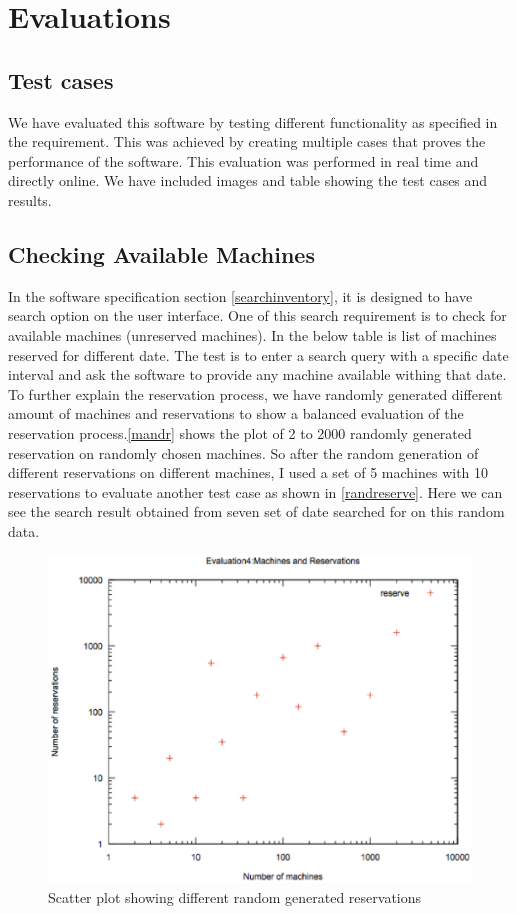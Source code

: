 \chapter{Evaluations} 
\label{chap:refs}
\label{chap:ch5_abbr}
\section{Test cases}
We have evaluated this software by testing different functionality as specified in the requirement. This was achieved by creating multiple cases that proves the performance of the software. This evaluation was performed in real time and directly online. We have included images and table showing the test cases and results. 
\section*{Checking Available Machines}
In the software specification section \ref{searchinventory}, it is designed to have search option on the user interface. One of this search requirement is to check for available machines (unreserved machines). In the below table is list of machines reserved for different date. The test is to enter a search query with a specific date interval and ask the software to provide any machine available withing that date.
To further explain the reservation process, we have randomly generated different amount of machines and reservations to show a balanced evaluation of the reservation process.\autoref{mandr} shows the plot of 2 to 2000 randomly generated reservation on randomly chosen machines. So after the random generation of different reservations on different machines, I used a set of 5 machines with 10 reservations to evaluate another test case as shown in \autoref{randreserve}. Here we can see the search result obtained from seven set of date searched for on this random data.
\begin{figure}
\includegraphics[width=\linewidth]{mandr.eps}
\caption{Scatter plot showing different random generated reservations}
\label{mandr}
\end{figure}

